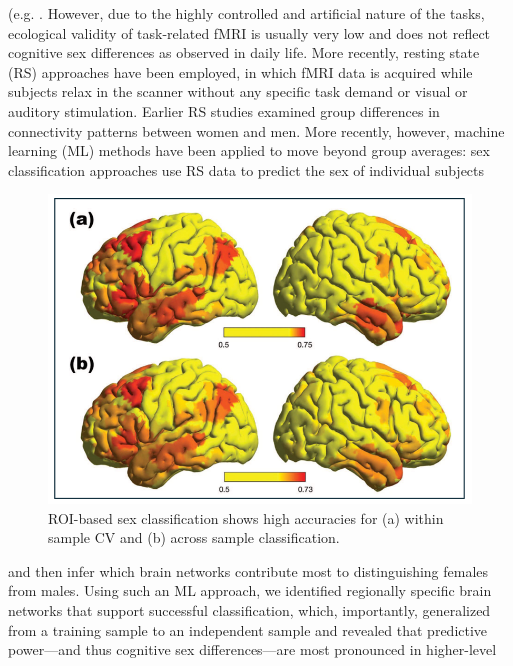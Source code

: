 \documentclass[11pt,a4paper]{article}
\begin{document}
(e.g. \parencite{thimmMenstrualCycleEffects2014a,weisDynamicChangesFunctional2011,weisEstradiolModulatesFunctional2008}. 
However, due to the highly 
controlled and artificial nature of the tasks, ecological validity of task-related fMRI is usually 
very low and does not reflect cognitive sex differences as observed in daily life. More recently, 
resting state (RS) approaches have been employed, in which fMRI data is acquired while subjects relax 
in the scanner without any specific task demand or visual or auditory stimulation. Earlier
RS studies examined group differences in connectivity patterns between women and men. 
More recently, however, machine learning (ML) methods have been applied to move beyond group averages: sex classification approaches 
use RS data to predict the sex of individual subjects 
\begin{figure} %
  \vspace{-10pt} %
  \includegraphics[width=\linewidth]{sex_classification.png}
  \caption{ROI-based sex classification shows high accuracies for (a) within sample CV and (b) across sample classification.}
  \label{fig:sexclass}
\end{figure}
and then infer which brain networks contribute most to 
distinguishing females from males. Using such an ML approach, we identified regionally specific brain networks 
that support successful classification, which, importantly, generalized from a training sample to an independent 
sample and revealed that predictive power—and thus cognitive sex differences—are most pronounced in higher-level 
\end{document}
